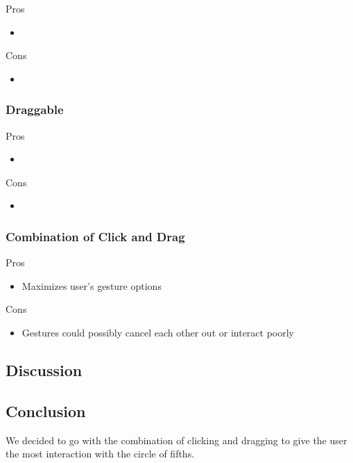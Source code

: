 \documentclass[onecolumn, draftclsnofoot,10pt, compsoc]{IEEEtran}
\begin{document}
Pros

\begin{itemize}
    \item 
\end{itemize}

Cons

\begin{itemize}
    \item 
\end{itemize}

\subsubsection{Draggable}

Pros

\begin{itemize}
    \item 
\end{itemize}

Cons

\begin{itemize}
    \item 
\end{itemize}

\subsubsection{Combination of Click and Drag}

Pros

\begin{itemize}
    \item Maximizes user's gesture options
\end{itemize}

Cons

\begin{itemize}
    \item Gestures could possibly cancel each other out or interact poorly
\end{itemize}

\subsection{Discussion}
\subsection{Conclusion}
We decided to go with the combination of clicking and dragging to give the user the most interaction with the circle of fifths. 
\end{document}
